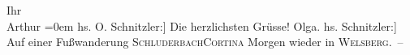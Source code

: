 \begin{ledgroupsized}[t]{13cm}
           \pstart
           Ihr{\\[\baselineskip]}\spacefill\mbox{Arthur}\pend
           \leftskip=0em{}\pstart
           \noindent{}{[}hs. O. Schnitzler:{]} Die herzlichsten Grüsse!\pend
           \pstart \spacefill\mbox{Olga.}\pend{}\pstart
           \noindent{}{[}hs. Schnitzler:{]} Auf einer Fußwanderung \textsc{Schluderbach}\textsc{Cortina}\pend
           \pstart
           Morgen wieder in \textsc{Welsberg}. –\pend
                     \endnumbering{}\end{ledgroupsized}  \newcommand{\dateiname}{L01699}\newcommand{\titel}{Arthur und Olga Schnitzler an Richard Beer-Hofmann, 13. 8. 1907}\newcommand{\editorInnen}{Martin Anton Müller und Gerd-Hermann Susen}
            \footnotesize
\begin{ledgroupsized}[t]{11.5cm}
\end{ledgroupsized}
         
      
